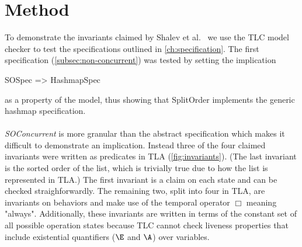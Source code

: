 \documentclass{uit-thesis}
\begin{document}
\section{Method}
To demonstrate the invariants claimed by Shalev et al.~\cite{Shalev2006} we use the TLC model checker to test the specifications outlined in \autoref{ch:specification}. The first specification (\autoref{subsec:non-concurrent}) was tested by setting the implication
\begin{tla}
    SOSpec => HashmapSpec
\end{tla}
\begin{tlatex}
%
\end{tlatex}
as a property of the model, thus showing that SplitOrder implements the generic hashmap specification.
\\\\
\textit{SOConcurrent} is more granular than the abstract specification which makes it difficult to demonstrate an implication. Instead three of the four claimed invariants were written as predicates in TLA (\autoref{fig:invariants}). (The last invariant is the sorted order of the list, which is trivially true due to how the list is represented in TLA.) The first invariant is a claim on each state and can be checked straighforwardly. The remaining two, split into four in TLA, are invariants on behaviors and make use of the temporal operator $\Box$ meaning "always". Additionally, these invariants are written in terms of the constant set of all possible operation states because TLC cannot check liveness properties that include existential quantifiers ($\E$ and $\A$) over variables.
\end{document}
